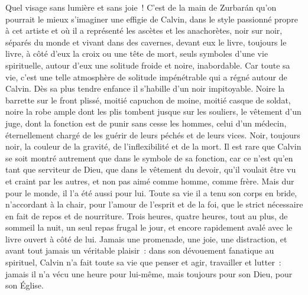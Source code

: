 \documentclass[french,twoside]{book} %
\begin{document}
Quel visage sans lumière et sans joie ! C’est de la main de Zurbarán qu’on pourrait le mieux s’imaginer une effigie de Calvin, dans le style passionné propre à cet artiste et où il a représenté les ascètes et les anachorètes, noir sur noir, séparés du monde et vivant dans des cavernes, devant eux le livre, toujours le livre, à côté d’eux la croix ou une tête de mort, seuls symboles d’une vie spirituelle, autour d’eux une solitude froide et noire, inabordable. Car toute sa vie, c’est une telle atmosphère de solitude impénétrable qui a régné autour de Calvin. Dès sa plus tendre enfance il s’habille d’un noir impitoyable. Noire la barrette sur le front plissé, moitié capuchon de moine, moitié casque de soldat, noire la robe ample dont les plis tombent jusque sur les souliers, le vêtement d’un juge, dont la fonction est de punir sans cesse les hommes, celui d’un médecin, éternellement chargé de les guérir de leurs péchés et de leurs vices. Noir, toujours noir, la couleur de la gravité, de l’inflexibilité et de la mort. Il est rare que Calvin se soit montré autrement que dans le symbole de sa fonction, car ce n’est qu’en tant que serviteur de Dieu, que dans le vêtement du devoir, qu’il voulait être vu et craint par les autres, et non pas aimé comme homme, comme frère. Mais dur pour le monde, il l’a été aussi pour lui. Toute sa vie il a tenu son corps en bride, n’accordant à la chair, pour l’amour de l’esprit et de la foi, que le strict nécessaire en fait de repos et de nourriture. Trois heures, quatre heures, tout au plus, de sommeil la nuit, un seul repas frugal le jour, et encore rapidement avalé avec le livre ouvert à côté de lui. Jamais une promenade, une joie, une distraction, et avant tout jamais un véritable plaisir : dans son dévouement fanatique au spirituel, Calvin n’a fait toute sa vie que penser et agir, travailler et lutter : jamais il n’a vécu une heure pour lui-même, mais toujours pour son Dieu, pour son Église.\par
\end{document}
